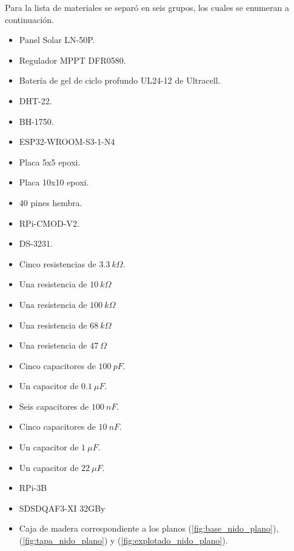 Para la lista de materiales se separó en seis grupos, los cuales se enumeran a continuación.

\begin{itemize}
	\item Panel Solar LN-50P.
	\item Regulador MPPT DFR0580.
	\item Batería de gel de ciclo profundo UL24-12 de Ultracell.
\end{itemize}

\begin{itemize}
	\item DHT-22.
	\item BH-1750.
	\item ESP32-WROOM-S3-1-N4
	\item Placa 5x5 epoxi.
	\item Placa 10x10 epoxi.
	\item 40 pines hembra.
	\item RPi-CMOD-V2.
	\item DS-3231.
	\item Cinco resistencias de $3.3 \ k\Omega$.
	\item Una resistencia de $10 \ k\Omega$
	\item Una resistencia de $100 \ k\Omega$
	\item Una resistencia de $68 \ k\Omega$
	\item Una resistencia de $47 \ \Omega$
	\item Cinco capacitores de $100 \ pF$.
	\item Un capacitor de $0.1 \ \mu F$.
	\item Seis capacitores de $100 \ nF$.
	\item Cinco capacitores de $10 \ nF$.
	\item Un capacitor de $1 \ \mu F$.
	\item Un capacitor de $22 \ \mu F$.
\end{itemize}

\begin{itemize}
	\item RPi-3B
	\item SDSDQAF3-XI 32GBy
\end{itemize}

\begin{itemize}
	\item Caja de madera correspondiente a los planos (\ref{fig:base_nido_plano}), (\ref{fig:tapa_nido_plano}) y (\ref{fig:explotado_nido_plano}).
\end{itemize}

